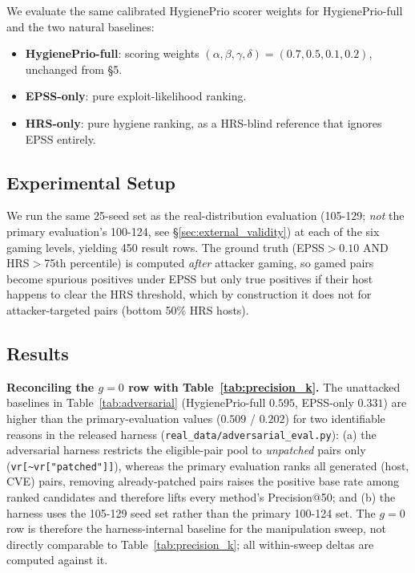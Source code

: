 We evaluate the same calibrated HygienePrio scorer weights for HygienePrio-full
and the two natural baselines:
\begin{itemize}
\item \textbf{HygienePrio-full}: scoring weights $(\alpha, \beta,
\gamma, \delta) = (0.7, 0.5, 0.1, 0.2)$, unchanged from \S5.
\item \textbf{EPSS-only}: pure exploit-likelihood ranking.
\item \textbf{HRS-only}: pure hygiene ranking, as a HRS-blind reference
that ignores EPSS entirely.
\end{itemize}

\subsection{Experimental Setup}

We run the same 25-seed set as the real-distribution evaluation
(105-129; \emph{not} the primary evaluation's 100-124, see
\S\ref{sec:external_validity}) at each of the six gaming levels,
yielding 450 result rows. The ground truth (EPSS$>0.10$ AND
HRS$>$75th percentile) is computed \emph{after} attacker gaming, so
gamed pairs become spurious positives under EPSS but only true
positives if their host happens to clear the HRS threshold, 
which by construction it does not for attacker-targeted pairs (bottom
50\% HRS hosts).



\subsection{Results}

\textbf{Reconciling the $g=0$ row with Table~\ref{tab:precision_k}.}
The unattacked baselines in Table~\ref{tab:adversarial}
(HygienePrio-full $0.595$, EPSS-only $0.331$) are higher than the
primary-evaluation values ($0.509$ / $0.202$) for two identifiable
reasons in the released harness
(\texttt{real\_data/\allowbreak adversarial\_eval.py}): (a) the adversarial
harness restricts the eligible-pair pool to \emph{unpatched} pairs
only (\texttt{vr[\textasciitilde vr["patched"]]}), whereas the
primary evaluation ranks all generated (host, CVE) pairs, removing
already-patched pairs raises the positive base rate among ranked
candidates and therefore lifts every method's Precision@50; and
(b) the harness uses the 105-129 seed set rather than the primary
100-124 set. The $g=0$ row is therefore the harness-internal
baseline for the manipulation sweep, not directly comparable to
Table~\ref{tab:precision_k}; all within-sweep deltas are computed
against it.

